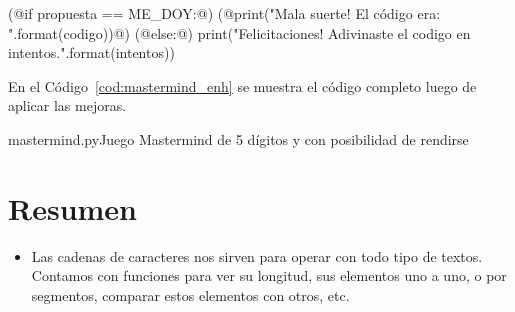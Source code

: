 \begin{enumerate}
\begin{codigo-python-sn}
    (@if propuesta == ME_DOY:@)
        (@print("Mala suerte! El código era: {}".format(codigo))@)
    (@else:@)
        print("Felicitaciones! Adivinaste el codigo en {} intentos.".format(intentos))
\end{codigo-python-sn}

En el Código~\ref{cod:mastermind_enh} se muestra el código completo luego de
aplicar las mejoras.

\begin{codigo}{\label{cod:mastermind_enh} mastermind.py}{Juego Mastermind de 5
    dígitos y con posibilidad de rendirse}

\end{codigo}
\end{enumerate}




\clearpage

\section{Resumen}

\begin{itemize}
\item Las cadenas de caracteres nos sirven para operar con todo tipo de
textos.  Contamos con funciones para ver su longitud, sus elementos uno a
uno, o por segmentos, comparar estos elementos con otros, etc.
\end{itemize}

